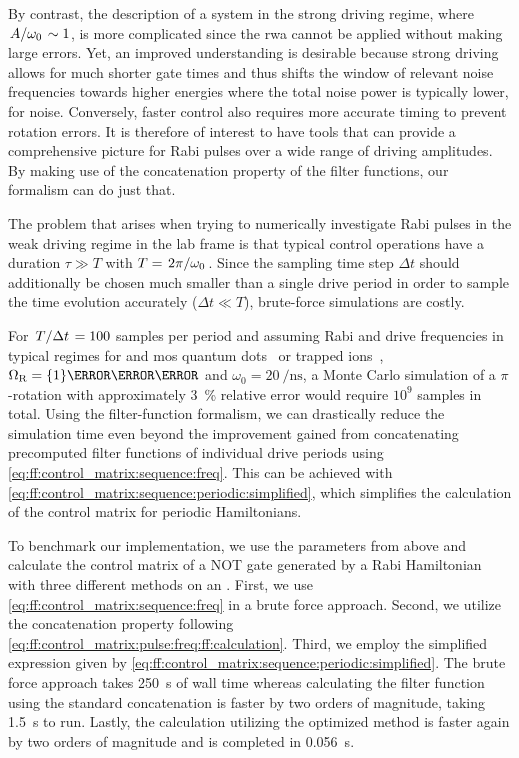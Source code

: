 By contrast, the description of a system in the strong driving regime, where $\flatfrac{A}{\omega_0}\sim 1$, is more complicated since the \gls{rwa} cannot be applied without making large errors.
Yet, an improved understanding is desirable because strong driving allows for much shorter gate times and thus shifts the window of relevant noise frequencies towards higher energies where the total noise power is typically lower, \eg for \oneoverf noise.
Conversely, faster control also requires more accurate timing to prevent rotation errors.
It is therefore of interest to have tools that can provide a comprehensive picture for Rabi pulses over a wide range of driving amplitudes.
By making use of the concatenation property of the filter functions, our formalism can do just that.

The problem that arises when trying to numerically investigate Rabi pulses in the weak driving regime in the lab frame is that typical control operations have a duration $\tau\gg T$ with $T = \flatfrac{2\pi}{\omega_0}$.
Since the sampling time step $\Delta t$ should additionally be chosen much smaller than a single drive period in order to sample the time evolution accurately ($\Delta t\ll T$), brute-force simulations are costly.

For $\flatfrac{T}{\Delta t} = 100$ samples per period and assuming Rabi and drive frequencies in typical regimes for  and \gls{mos} quantum dots~\cite{Zajac2018,Pla2012} or trapped ions~\cite{Soare2014}, $\Omega_\mr{R} = \qty{1}{\per\micro\second}$ and $\omega_0 = \qty{20}{\per\nano\second}$, a Monte Carlo simulation of a $\pi$-rotation with approximately \qty{3}{\percent} relative error would require $10^9$ samples in total.
Using the filter-function formalism, we can drastically reduce the simulation time even beyond the improvement gained from concatenating precomputed filter functions of individual drive periods using \cref{eq:ff:control_matrix:sequence:freq}.
This can be achieved with \cref{eq:ff:control_matrix:sequence:periodic:simplified}, which simplifies the calculation of the control matrix for periodic Hamiltonians.

To benchmark our implementation, we use the parameters from above and calculate the control matrix of a NOT gate generated by a Rabi Hamiltonian with three different methods on an \fastprocessor.
First, we use \cref{eq:ff:control_matrix:sequence:freq} in a brute force approach.
Second, we utilize the concatenation property following \cref{eq:ff:control_matrix:pulse:freq:ff:calculation}.
Third, we employ the simplified expression given by \cref{eq:ff:control_matrix:sequence:periodic:simplified}.
The brute force approach takes \qty{250}{\second} of wall time whereas calculating the filter function using the standard concatenation is faster by two orders of magnitude, taking \qty{1.5}{\second} to run.
Lastly, the calculation utilizing the optimized method is faster again by two orders of magnitude and is completed in \qty{0.056}{\second}.

